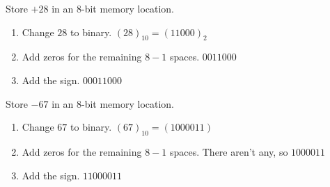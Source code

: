 \documentclass[../notes.tex]{subfiles}
\begin{document}
					\begin{example}
						Store $+28$ in an $8$-bit memory location.
						\begin{enumerate}
							\item Change $28$ to binary. $(28)_{10} = (11000)_{2}$
							\item Add zeros for the remaining $8 - 1$ spaces. $0011000$
							\item Add the sign. $00011000$
						\end{enumerate}
					\end{example}
					\begin{example}
						Store $-67$ in an $8$-bit memory location.
						\begin{enumerate}
							\item Change $67$ to binary. $(67)_{10} = (1000011)$
							\item Add zeros for the remaining $8 - 1$ spaces. There aren't any, so $1000011$
							\item Add the sign. $11000011$
						\end{enumerate}
					\end{example}
\end{document}
